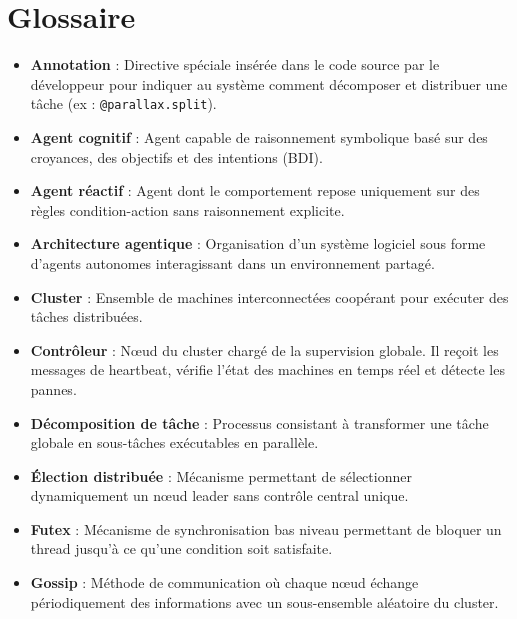 \documentclass[12pt,a4paper]{report}
\begin{document}
\chapter*{Glossaire}

\begin{itemize}

\item[*] \textbf{Annotation} : Directive spéciale insérée dans le code source par le développeur pour indiquer au système comment décomposer et distribuer une tâche (ex : \texttt{@parallax.split}).

\item[*] \textbf{Agent cognitif} : Agent capable de raisonnement symbolique basé sur des croyances, des objectifs et des intentions (BDI).

\item[*] \textbf{Agent réactif} : Agent dont le comportement repose uniquement sur des règles condition-action sans raisonnement explicite.

\item[*] \textbf{Architecture agentique} : Organisation d'un système logiciel sous forme d'agents autonomes interagissant dans un environnement partagé.

\item[*] \textbf{Cluster} : Ensemble de machines interconnectées coopérant pour exécuter des tâches distribuées.

\item[*] \textbf{Contrôleur} : Nœud du cluster chargé de la supervision globale. Il reçoit les messages de heartbeat, vérifie l'état des machines en temps réel et détecte les pannes.

\item[*] \textbf{Décomposition de tâche} : Processus consistant à transformer une tâche globale en sous-tâches exécutables en parallèle.

\item[*] \textbf{Élection distribuée} : Mécanisme permettant de sélectionner dynamiquement un nœud leader sans contrôle central unique.

\item[*] \textbf{Futex} : Mécanisme de synchronisation bas niveau permettant de bloquer un thread jusqu'à ce qu'une condition soit satisfaite.

\item[*] \textbf{Gossip} : Méthode de communication où chaque nœud échange périodiquement des informations avec un sous-ensemble aléatoire du cluster.


\end{itemize}
\end{document}
